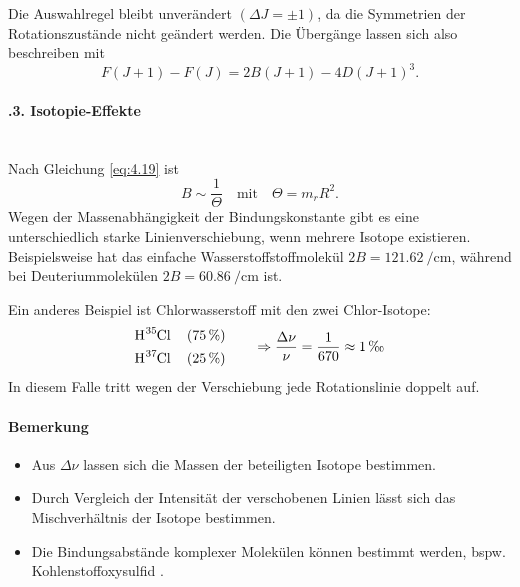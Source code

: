 	Die Auswahlregel bleibt unverändert $\left( \Delta J = \pm 1 \right)$, da die Symmetrien der Rotationszustände nicht geändert werden. 
	Die Übergänge lassen sich also beschreiben mit
	\begin{equation}
		\label{eq:4.29}
		F(J+1) - F(J) = 2B(J+1) - 4D(J+1)^3.
	\end{equation}

\paragraph{\thesubsubsection.3. Isotopie-Effekte}~\\

	Nach Gleichung \eqref{eq:4.19} ist
	$$
	B \sim  \frac{1}{ \Theta}\quad\text{mit}\quad\Theta = m_{r} R^2.
	$$ 
	Wegen der Massenabhängigkeit der Bindungskonstante gibt es eine unterschiedlich starke Linienverschiebung, wenn mehrere Isotope existieren. 
	Beispielsweise hat das einfache Wasserstoffstoffmolekül  $2B=\SI{121,62}{\per\centi\meter}$, während bei Deuteriummolekülen  $2B=\SI{60,86}{\per\centi\meter}$ ist.

	Ein anderes Beispiel ist Chlorwasserstoff mit den zwei Chlor-Isotope:
	$$
	\begin{aligned}
		&\ce{H^{35}Cl} \quad \left( \SI{75}{\percent} \right) \\
		&\ce{H^{37}Cl} \quad \left( \SI{25}{\percent} \right) 
	\end{aligned} \quad
	\quad\Rightarrow\frac{ \Delta \nu}{ \nu} = \frac{1}{670} \approx 1\,\text{\textperthousand}
	$$
	In diesem Falle tritt wegen der Verschiebung jede Rotationslinie doppelt auf.

\paragraph{Bemerkung}
	\begin{itemize}
		\item Aus $ \Delta \nu$ lassen sich die Massen der beteiligten Isotope bestimmen.
		\item Durch Vergleich der Intensität der verschobenen Linien lässt sich das Mischverhältnis der Isotope bestimmen.
		\item Die Bindungsabstände komplexer Molekülen können bestimmt werden, bspw. Kohlenstoffoxysulfid .
	\end{itemize}
